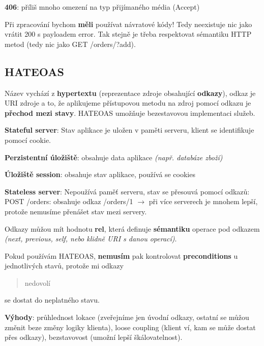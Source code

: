 \vspace{2pt}
\noindent \textbf{406}: příliš mnoho omezení na typ přijímaného média (Accept)

\vspace{6pt}
\noindent Při zpracování bychom \textbf{měli} používat návratové kódy! Tedy neexistuje nic jako vrátit 200 s payloadem error. Tak stejně je třeba respektovat sémantiku HTTP metod (tedy nic jako GET /orders/?add).

\subsection{HATEOAS}

Název vychází z \textbf{hypertextu} (reprezentace zdroje obsahující \textbf{odkazy}), odkaz je URI zdroje a to, že aplikujeme přístupovou metodu na zdroj pomocí odkazu je \textbf{přechod mezi stavy}. HATEOAS umožňuje bezestavovou implementaci služeb.

\vspace{6pt}
\noindent \textbf{Stateful server}: Stav aplikace je uložen v paměti serveru, klient se identifikuje pomocí cookie.

\vspace{2pt}
\noindent \textbf{Perzistentní úložiště}: obsahuje data aplikace \textit{(např. databáze zboží)}

\vspace{2pt}
\noindent \textbf{Úložiště session}: obsahuje stav aplikace, používá se cookies

\vspace{6pt}
\noindent \textbf{Stateless server}: Nepoužívá paměť serveru, stav se přesouvá pomocí odkazů: POST /orders: obsahuje odkaz /orders/1 $\to$ při více serverech je mnohem lepší, protože nemusíme přenášet stav mezi servery.

\vspace{2pt}
\noindent Odkazy můžou mít hodnotu \textbf{rel}, která definuje \textbf{sémantiku} operace pod odkazem \textit{(next, previous, self, nebo klidně URI s danou operací)}.

\vspace{6pt}
\noindent Pokud používám HATEOAS, \textbf{nemusím} pak kontrolovat \textbf{preconditions} u jednotlivých stavů, protože mi odkazy \blockquote{nedovolí} se dostat do neplatného stavu.

\vspace{4pt}
\noindent \textbf{Výhody}: průhlednost lokace (zveřejníme jen úvodní odkazy, ostatní se můžou změnit beze změny logiky klienta), loose coupling (klient ví, kam se může dostat přes odkazy), bezstavovost (umožní lepší škálovatelnost).

